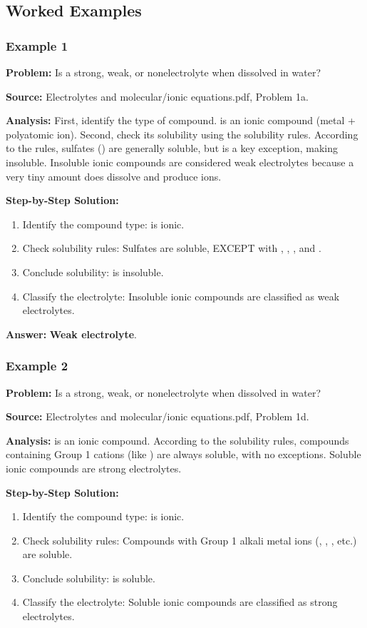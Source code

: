 \documentclass{article}
\begin{document}
\subsection{Worked Examples}
\subsubsection{Example 1}
\textbf{Problem:} Is  a strong, weak, or nonelectrolyte when dissolved in water?

\textbf{Source:} Electrolytes and molecular/ionic equations.pdf, Problem 1a.

\textbf{Analysis:} First, identify the type of compound.  is an ionic compound (metal + polyatomic ion). Second, check its solubility using the solubility rules. According to the rules, sulfates () are generally soluble, but  is a key exception, making  insoluble. Insoluble ionic compounds are considered weak electrolytes because a very tiny amount does dissolve and produce ions.

\textbf{Step-by-Step Solution:}
\begin{enumerate}
    \item Identify the compound type:  is ionic.
    \item Check solubility rules: Sulfates are soluble, EXCEPT with , , , and .
    \item Conclude solubility:  is insoluble.
    \item Classify the electrolyte: Insoluble ionic compounds are classified as weak electrolytes.
\end{enumerate}

\textbf{Answer:} \textbf{Weak electrolyte}.

\subsubsection{Example 2}
\textbf{Problem:} Is  a strong, weak, or nonelectrolyte when dissolved in water?

\textbf{Source:} Electrolytes and molecular/ionic equations.pdf, Problem 1d.

\textbf{Analysis:}  is an ionic compound. According to the solubility rules, compounds containing Group 1 cations (like ) are always soluble, with no exceptions. Soluble ionic compounds are strong electrolytes.

\textbf{Step-by-Step Solution:}
\begin{enumerate}
    \item Identify the compound type:  is ionic.
    \item Check solubility rules: Compounds with Group 1 alkali metal ions (, , , etc.) are soluble.
    \item Conclude solubility:  is soluble.
    \item Classify the electrolyte: Soluble ionic compounds are classified as strong electrolytes.
\end{enumerate}
\end{document}
